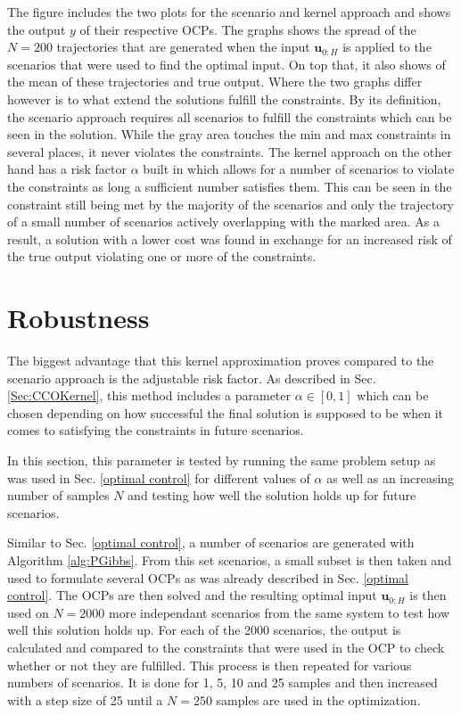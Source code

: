 The figure includes the two plots for the scenario and kernel approach and shows the output $y$ of their respective OCPs. The graphs shows the spread of the $N = 200$ trajectories that are generated when the input $\boldsymbol{u}_{0:H}$ is applied to the scenarios that were used to find the optimal input. On top that, it also shows of the mean of these trajectories and true output. Where the two graphs differ however is to what extend the solutions fulfill the constraints. By its definition, the scenario approach requires all scenarios to fulfill the constraints which can be seen in the solution. While the gray area touches the min and max constraints in several places, it never violates the constraints. The kernel approach on the other hand has a risk factor $\alpha$ built in which allows for a number of scenarios to violate the constraints as long a sufficient number satisfies them. This can be seen in the constraint still being met by the majority of the scenarios and only the trajectory of a small number of scenarios actively overlapping with the marked area. As a result, a solution with a lower cost was found in exchange for an increased risk of the true output violating one or more of the constraints.




\section{Robustness} \label{performance guarantees}

The biggest advantage that this kernel approximation proves compared to the scenario approach is the adjustable risk factor. As described in Sec. \ref{Sec:CCOKernel}, this method includes a parameter $\alpha \in [0, 1]$ which can be chosen depending on how successful the final solution is supposed to be when it comes to satisfying the constraints in future scenarios. 

In this section, this parameter is tested by running the same problem setup as was used in Sec. \ref{optimal control} for different values of $\alpha$ as well as an increasing number of samples $N$ and testing how well the solution holds up for future scenarios.

Similar to Sec. \ref{optimal control}, a number of scenarios are generated with Algorithm \ref{alg:PGibbs}. From this set scenarios, a small subset is then taken and used to formulate several OCPs as was already described in Sec. \ref{optimal control}. The OCPs are then solved and the resulting optimal input $\boldsymbol{u}_{0:H}$ is then used on $N = 2000$ more independant scenarios from the same system to test how well this solution holds up. For each of the 2000 scenarios, the output is calculated and compared to the constraints that were used in the OCP to check whether or not they are fulfilled. This process is then repeated for various numbers of scenarios. It is done for 1, 5, 10 and 25 samples and then increased with a step size of 25 until a $N = 250$ samples are used in the optimization.

